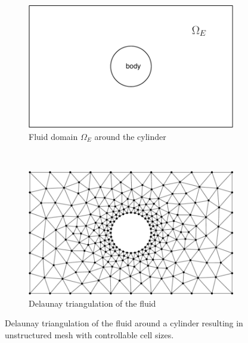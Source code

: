 \begin{figure}[!b]
        \centering
        \begin{subfigure}[b]{0.5\textwidth}
                \includegraphics[width=\textwidth]{figures/eulerian/cylinderPreDelauney-crop.pdf}
                \caption{Fluid domain $\Omega_E$ around the cylinder}
                \label{fig:cylinderPreDelauney}
        \end{subfigure}%
        ~ %
        \begin{subfigure}[b]{0.5\textwidth}
                \includegraphics[width=\textwidth]{figures/eulerian/cylinderDelauney-crop.pdf}
                \caption{Delaunay triangulation of the fluid}
                \label{fig:cylinderDelauney}
        \end{subfigure}
        \caption{Delaunay triangulation of the fluid around a cylinder resulting in unstructured mesh with controllable cell sizes.}
        \label{fig:cylinderFiniteElementDiscretization}
\end{figure}	
	
